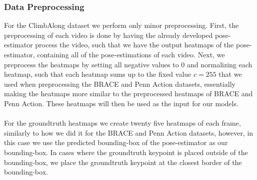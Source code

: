 \documentclass[./main.tex]{subfiles}
\begin{document}
\subsubsection{Data Preprocessing}
For the ClimbAlong dataset we perform only minor preprocessing. First, the preprocessing of each video is done by having the already developed pose-estimator process the video, such that we have the output heatmaps of the pose-estimator, containing all of the pose-estimations of each video. Next, we preprocess the heatmaps by setting all negative values to $0$ and normalizing each heatmap, such that each heatmap sums up to the fixed value $c = 255$ that we used when preprocessing the BRACE and Penn Action datasets, essentially making the heatmaps more similar to the preprocessed heatmaps of BRACE and Penn Action. These heatmaps will then be used as the input for our models.
\\
\\
For the groundtruth heatmaps we create twenty five heatmaps of each frame, similarly to how we did it for the BRACE and Penn Action datasets, however, in this case we use the predicted bounding-box of the pose-estimator as our bounding-box. In cases where the groundtruth keypoint is placed outside of the bounding-box, we place the groundtruth keypoint at the closest border of the bounding-box.
\end{document}
